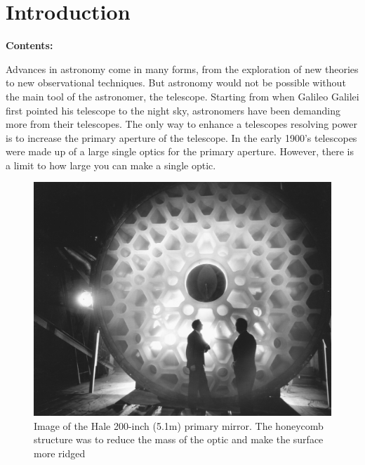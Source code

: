 
\chapter{Introduction} %

\noindent\textbf{\large Contents:}

\noindent\hrulefill
\noindent\startcontents[chapters]
\noindent{}
\noindent\hrulefill

\label{Chapter1} %

Advances in astronomy come in many forms, from the exploration of new theories to new observational techniques.
But astronomy would not be possible without the main tool of the astronomer, the telescope.  Starting from when
Galileo Galilei first pointed his telescope to the night sky, astronomers have been demanding more from their
telescopes.  The only way to enhance a telescopes resolving power is to increase the primary aperture of the
telescope.  In the early 1900's telescopes were made up of a large single optics for the primary aperture. 
However, there is a limit to how large you can make a single optic.  


\begin{figure}[H]
\centering
\includegraphics[width=12 cm]{../Figures/twomen}
\caption{Image of the Hale 200-inch (5.1m) primary mirror.  The honeycomb structure was to reduce the mass of the optic and make the surface more ridged}
\label{fig:hale}
\end{figure}

